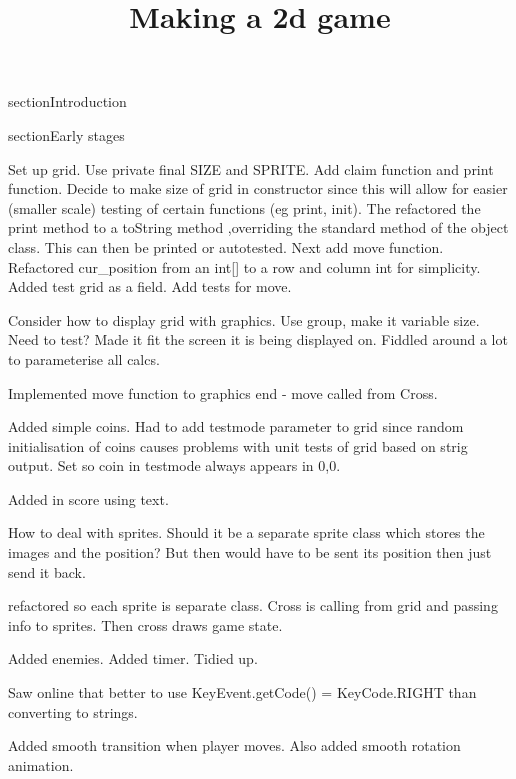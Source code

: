 \documentclass{article}
\begin{document}
\title{Making a 2d game}
\maketitle

section{Introduction}

section{Early stages}

Set up grid. Use private final SIZE and SPRITE. Add claim function and print function. Decide to make size of grid
in constructor since this will allow for easier (smaller scale) testing of certain functions (eg print, init).
The refactored the print method to a toString method ,overriding the standard method of the object class. This
can then be printed or autotested. Next add move function. Refactored cur_position from an int[] to a row and
column int for simplicity. Added test grid as a field. Add tests for move.

Consider how to display grid with graphics. Use group, make it variable size. Need to test? Made it fit the screen
it is being displayed on. Fiddled around a lot to parameterise all calcs.

Implemented move function to graphics end - move called from Cross.

Added simple coins. Had to add testmode parameter to grid since random initialisation of coins causes problems with
unit tests of grid based on strig output. Set so coin in testmode always appears in 0,0.

Added in score using text.

How to deal with sprites. Should it be a separate sprite class which stores the images and the position? But then
would have to be sent its position then just send it back.

refactored so each sprite is separate class. Cross is calling from grid and passing info to sprites. Then cross draws
game state.

Added enemies. Added timer. Tidied up.

Saw online that better to use KeyEvent.getCode() = KeyCode.RIGHT than converting to strings.

Added smooth transition when player moves. Also added smooth rotation animation.
\end{document}
